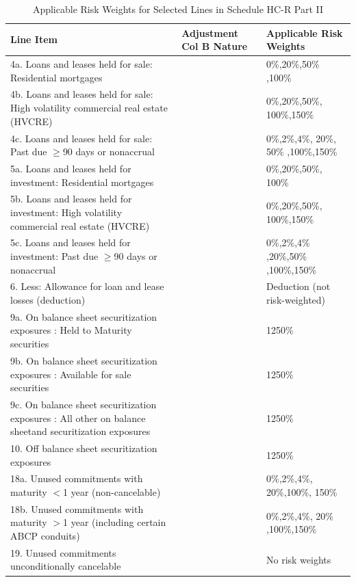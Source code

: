 \documentclass[conference]{IEEEtran}
\begin{document}
\begin{table}[htbp]
	\centering
	\caption{Applicable Risk Weights for Selected Lines in Schedule HC-R Part II}
	\begin{tabular}{|p{3cm}|p{1.5cm}|p{1.5cm}|}
		\hline
		\textbf{Line Item} & \textbf{Adjustment Col B Nature} & \textbf{Applicable Risk Weights} \\
		\hline
		4a. Loans and leases held for sale: Residential mortgages &  & 0\%,20\%,50\% ,100\% \\
		\hline
		4b. Loans and leases held for sale: High volatility commercial real estate (HVCRE) &  & 0\%,20\%,50\%, 100\%,150\% \\
		\hline
		4c. Loans and leases held for sale: Past due $\ge$90 days or nonaccrual &  & 0\%,2\%,4\%, 20\%, 50\% ,100\%,150\% \\
		\hline
		5a. Loans and leases held for investment: Residential mortgages &  & 0\%,20\%,50\%, 100\% \\
		\hline
		5b. Loans and leases held for investment: High volatility commercial real estate (HVCRE) &  & 0\%,20\%,50\%, 100\%,150\% \\
		\hline
		5c. Loans and leases held for investment: Past due $\ge$90 days or nonaccrual &  & 0\%,2\%,4\% ,20\%,50\% ,100\%,150\% \\
		\hline
		6. Less: Allowance for loan and lease losses (deduction) &  & Deduction (not risk-weighted) \\
		\hline
		9a. On balance sheet securitization exposures : Held to Maturity securities &  & 1250\% \\
		\hline
		9b. On balance sheet securitization exposures : Available for sale securities &  & 1250\% \\
		\hline
		9c. On balance sheet securitization exposures : All other on balance sheetand securitization exposures &  & 1250\% \\
		\hline
		10. Off balance sheet securitization exposures &  & 1250\% \\
		\hline
		18a. Unused commitments with maturity $<$1 year (non-cancelable) &  & 0\%,2\%,4\%, 20\%,100\%, 150\% \\
		\hline
		18b. Unused commitments with maturity $>$1 year (including certain ABCP conduits) &  & 0\%,2\%,4\%, 20\% ,100\%,150\% \\
		\hline
		19. Unused commitments unconditionally cancelable &  & No risk weights \\
		\hline
	\end{tabular}
\end{table}
\end{document}
